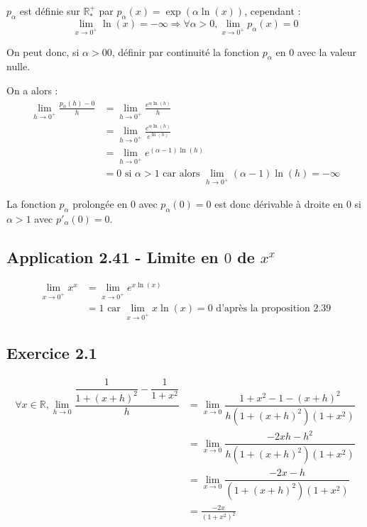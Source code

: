 \documentclass{report}
\begin{document}
$p_{\alpha}$ est définie sur $\mathbb{R}^{+}_{*}$ par $p_{\alpha}(x) = \exp(\alpha \ln(x))$, cependant :
\begin{displaymath}
	\lim_{x\rightarrow 0^{+}} \ln(x) = -\infty \Longrightarrow\forall \alpha>0, \lim_{x\rightarrow 0^{+}} p_{\alpha}(x) = 0
\end{displaymath}

On peut donc, si $\alpha > 0 0$, définir par continuité la fonction $p_{\alpha}$ en $0$ avec la valeur nulle.

On a alors :
\begin{equation*}
	\begin{split}
		\lim_{h\rightarrow 0^{+}} \frac{p_{\alpha}(h) - 0}{h}
		&= \lim_{h\rightarrow 0^{+}} \frac{e^{\alpha \ln(h)}}{h} \\
		&= \lim_{h\rightarrow 0^{+}} \frac{e^{\alpha \ln(h)}}{e^{\ln(h)}} \\
		&= \lim_{h\rightarrow 0^{+}} e^{(\alpha-1) \ln(h)} \\
		&=0 \text{ si $\alpha >1$ car alors $\lim_{h\rightarrow 0^{+}} (\alpha-1) \ln(h) = -\infty$}
	\end{split}
\end{equation*}

La fonction $p_{\alpha}$ prolongée en $0$ avec $p_{\alpha}(0)=0$ est donc dérivable à droite en $0$ si $\alpha>1$
avec $p'_{\alpha}(0)=0$.


\subsection*{Application 2.41 - Limite en $0$ de $x^x$}

\begin{equation*}
	\begin{split}
		\lim_{x\rightarrow 0^{+}} x^x
		&= \lim_{x\rightarrow 0^{+}} e^{x\ln(x)} \\
	    &= 1 \text{ car  $\lim_{x\rightarrow 0^{+}} x\ln(x) = 0$ d'après la proposition 2.39}
	\end{split}
\end{equation*}


\subsection*{Exercice 2.1}

\begin{equation*}
	\begin{split}
		\forall x \in \mathbb{R}, \lim_{h\rightarrow 0} \dfrac{\dfrac{1}{1+(x+h)^2}-\dfrac{1}{1+x^2}}{h}
		&= \lim_{x\rightarrow 0} \dfrac{1+x^2-1-(x+h)^2}{h(1+(x+h)^2)(1+x^2)} \\
		&= \lim_{x\rightarrow 0} \dfrac{-2xh-h^2}{h(1+(x+h)^2)(1+x^2)} \\
		&= \lim_{x\rightarrow 0} \dfrac{-2x-h}{(1+(x+h)^2)(1+x^2)} \\
		&= \frac{-2x}{(1+x^2)^2} \\
	\end{split}
\end{equation*}
\end{document}
